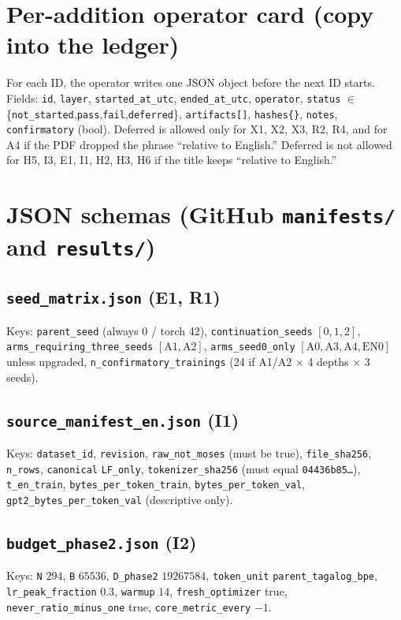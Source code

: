 \documentclass[11pt,a4paper]{article}
\begin{document}
\appendix
\section{Per-addition operator card (copy into the ledger)}
\label{app:cards}

For each ID, the operator writes one JSON object before the next ID starts. Fields: \texttt{id}, \texttt{layer}, \texttt{started\_at\_utc}, \texttt{ended\_at\_utc}, \texttt{operator}, \texttt{status} $\in$ \{\texttt{not\_started},\texttt{pass},\texttt{fail},\texttt{deferred}\}, \texttt{artifacts[]}, \texttt{hashes\{\}}, \texttt{notes}, \texttt{confirmatory} (bool). Deferred is allowed only for X1, X2, X3, R2, R4, and for A4 if the PDF dropped the phrase ``relative to English.'' Deferred is not allowed for H5, I3, E1, I1, H2, H3, H6 if the title keeps ``relative to English.''

\section{JSON schemas (GitHub \texttt{manifests/} and \texttt{results/})}
\label{app:json}

\subsection{\texttt{seed\_matrix.json} (E1, R1)}
Keys: \texttt{parent\_seed} (always 0 / torch 42), \texttt{continuation\_seeds} $[0,1,2]$, \texttt{arms\_requiring\_three\_seeds} $[\mathrm{A1},\mathrm{A2}]$, \texttt{arms\_seed0\_only} $[\mathrm{A0},\mathrm{A3},\mathrm{A4},\mathrm{EN0}]$ unless upgraded, \texttt{n\_confirmatory\_trainings} (24 if A1/A2 $\times$ 4 depths $\times$ 3 seeds).

\subsection{\texttt{source\_manifest\_en.json} (I1)}
Keys: \texttt{dataset\_id}, \texttt{revision}, \texttt{raw\_not\_moses} (must be true), \texttt{file\_sha256}, \texttt{n\_rows}, \texttt{canonical} \texttt{LF\_only}, \texttt{tokenizer\_sha256} (must equal \texttt{04436b85\ldots}), \texttt{t\_en\_train}, \texttt{bytes\_per\_token\_train}, \texttt{bytes\_per\_token\_val}, \texttt{gpt2\_bytes\_per\_token\_val} (descriptive only).

\subsection{\texttt{budget\_phase2.json} (I2)}
Keys: \texttt{N} $294$, \texttt{B} $65536$, \texttt{D\_phase2} $19267584$, \texttt{token\_unit} \texttt{parent\_tagalog\_bpe}, \texttt{lr\_peak\_fraction} $0.3$, \texttt{warmup} $14$, \texttt{fresh\_optimizer} true, \texttt{never\_ratio\_minus\_one} true, \texttt{core\_metric\_every} $-1$.
\end{document}
